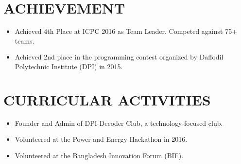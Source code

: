 \documentclass[letterpaper,11pt]{article}
\newcommand{\resumeItem}[1]{
  \item\small{
    {#1 \vspace{-1pt}}
  }
}
\newcommand{\resumeItemListStart}{\begin{itemize}}
\newcommand{\resumeItemListEnd}{\end{itemize}\vspace{0pt}}
\begin{document}
\section{ACHIEVEMENT}
        \resumeItemListStart
    	    \resumeItem {Achieved 4th Place at ICPC 2016 as Team Leader. Competed against 75+ teams.}
    	    \resumeItem {Achieved 2nd place in the programming contest organized by Daffodil Polytechnic Institute (DPI) in 2015.}
        \resumeItemListEnd

\section{CURRICULAR ACTIVITIES}
        \resumeItemListStart
    	    \resumeItem {Founder and Admin of DPI-Decoder Club, a technology-focused club.}
    	    \resumeItem {Volunteered at the Power and Energy Hackathon in 2016.}
    	    \resumeItem {Volunteered at the Bangladesh Innovation Forum (BIF).}
        \resumeItemListEnd

\end{document}
